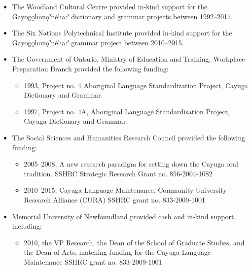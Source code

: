\begin{itemize}
\item The Woodland Cultural Centre provided in-kind support for the Gayogo̱honǫˀnéha:ˀ dictionary and grammar projects between 1992--2017.

\item The Six Nations Polytechnical Institute provided in-kind support for the Gayogo̱honǫˀnéha:ˀ grammar project between 2010--2015.

\item The Government of Ontario, Ministry of Education and Training, Workplace Preparation Branch provided the following funding:
\begin{itemize}
\item 1993, Project no. 4 Aboriginal Language Standardization Project, Cayuga Dictionary and Grammar. 
\item 1997, Project no. 4A, Aboriginal Language Standardisation Project, Cayuga Dictionary and Grammar. 
\end{itemize}

\item The Social Sciences and Humanities Research Council provided the following funding:
\begin{itemize}
\item 2005--2008, A new research paradigm for setting down the Cayuga oral tradition. SSHRC Strategic Research Grant no. 856-2004-1082 
\item 2010--2015, Cayuga Language Maintenance. Community-University Research Alliance (CURA) SSHRC grant no. 833-2009-1001
\end{itemize}

\item Memorial University of Newfoundland provided cash and in-kind support, including:
\begin{itemize}
\item 2010, the VP Research, the Dean of the School of Graduate Studies, and the Dean of Arts, matching funding for the Cayuga Language Maintenance SSHRC grant no. 833-2009-1001.
\end{itemize}

\end{itemize}
